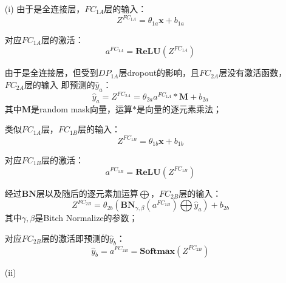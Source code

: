 \begin{solution}
    \begin{enumerate}
        \item[(i)] 由于是全连接层，$FC_{1A}$层的输入：$$Z^{FC_{1A}}=\theta_{1a}\bm{x}+b_{1a}$$

        对应$FC_{1A}$层的激活：$$a^{FC_{1A}}=\textbf{ReLU}(Z^{FC_{1A}})$$


        由于是全连接层，但受到$DP_{1A}$层dropout的影响，且$FC_{2A}$层没有激活函数，$FC_{2A}$层的输入
        即预测的$\hat{y}_a$：
        $$\hat{y}_a=Z^{FC_{2A}}=\theta_{2a}a^{FC_{1A}}*\textbf{M}+b_{2a}$$
        其中$\textbf{M}$是random mask向量，运算$*$是向量的逐元素乘法；

        类似$FC_{1A}$层，$FC_{1B}$层的输入：$$Z^{FC_{1B}}=\theta_{1b}\bm{x}+b_{1b}$$

        对应$FC_{1B}$层的激活：$$a^{FC_{1B}}=\textbf{ReLU}(Z^{FC_{1B}})$$

        经过$\textbf{BN}$层以及随后的逐元素加运算$\bigoplus$，$FC_{2B}$层的输入：
        $$Z^{FC_{2B}}=\theta_{2b}(\textbf{BN}_{\gamma,\beta}(a^{FC_{1B}})\bigoplus\hat{y}_a)+b_{2b}$$
        其中$\gamma,\beta$是Bitch Normalize的参数；

        对应$FC_{2B}$层的激活即预测的$\hat{y}_b$：$$\hat{y}_b=a^{FC_{2B}}=\textbf{Softmax}(Z^{FC_{2B}})$$
        \item[(ii)] 
    \end{enumerate}
\end{solution}